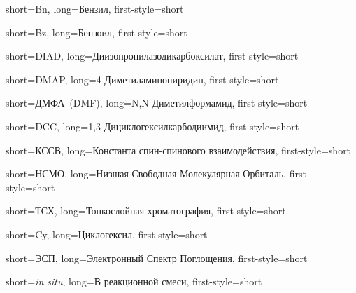

{
    short={Bn},
    long={Бензил},
    first-style=short
}


{
    short={Bz},
    long={Бензоил},
    first-style=short
}




{
    short={DIAD},
    long={Диизопропилазодикарбоксилат},
    first-style=short
}


{
    short={DMAP},
    long={4-Диметиламинопиридин},
    first-style=short
}


{
    short={ДМФА~(DMF)},
    long={N,N-Диметилформамид},
    first-style=short
}


{
    short={DCC},
    long={1,3-Дициклогексилкарбодиимид},
    first-style=short
}





{
    short={КССВ},
    long={Константа спин-спинового взаимодействия},
    first-style=short
}



{
    short={НСМО},
    long={Низшая Свободная Молекулярная Орбиталь},
    first-style=short
}






{
    short={ТСХ},
    long={Тонкослойная хроматография},
    first-style=short
}


{
    short={Cy},
    long={Циклогексил},
    first-style=short
}


{
    short={ЭСП},
    long={Электронный Спектр Поглощения},
    first-style=short
}




{
    short={\emph{in situ}},
    long={В реакционной смеси},
    first-style=short
}

